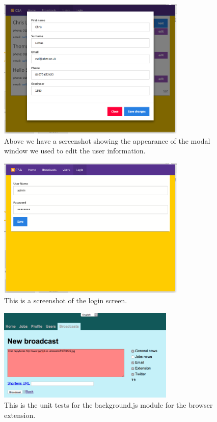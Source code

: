 \documentclass{article}
\begin{document}
\begin{figure}[!htbp]
\centering
\includegraphics[width=0.8\textwidth]{modalpage}
\caption{Above we have a screenshot showing the appearance of the modal window we used to edit the user information.}
\end{figure}

\begin{figure}[!htbp]
\centering
\includegraphics[width=0.8\textwidth]{loginpage}
\caption{This is a screenshot of the login screen.}
\end{figure}

\begin{figure}[!htbp]
\centering
\includegraphics[width=0.75\textwidth]{createbc}
\caption{This is the unit tests for the background.js module for the browser extension.}
\end{figure}
\end{document}
